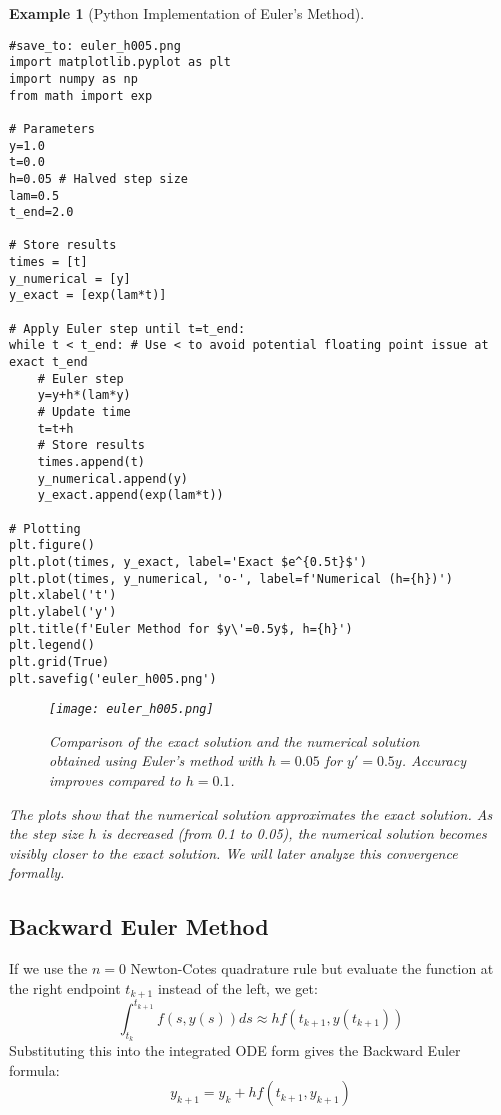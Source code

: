 \documentclass{article}
\newtheorem{example}{Example}
\begin{document}
\begin{example}[Python Implementation of Euler's Method]
\begin{verbatim}
#save_to: euler_h005.png
import matplotlib.pyplot as plt
import numpy as np
from math import exp

# Parameters
y=1.0
t=0.0
h=0.05 # Halved step size
lam=0.5
t_end=2.0

# Store results
times = [t]
y_numerical = [y]
y_exact = [exp(lam*t)]

# Apply Euler step until t=t_end:
while t < t_end: # Use < to avoid potential floating point issue at exact t_end
    # Euler step
    y=y+h*(lam*y)
    # Update time
    t=t+h
    # Store results
    times.append(t)
    y_numerical.append(y)
    y_exact.append(exp(lam*t))

# Plotting
plt.figure()
plt.plot(times, y_exact, label='Exact $e^{0.5t}$')
plt.plot(times, y_numerical, 'o-', label=f'Numerical (h={h})')
plt.xlabel('t')
plt.ylabel('y')
plt.title(f'Euler Method for $y\'=0.5y$, h={h}')
plt.legend()
plt.grid(True)
plt.savefig('euler_h005.png')
\end{verbatim}

\begin{figure}[h]
    \centering
    \texttt{[image: euler\_h005.png]}
    \caption{Comparison of the exact solution and the numerical solution obtained using Euler's method with $h=0.05$ for $y' = 0.5y$. Accuracy improves compared to $h=0.1$.}
    \label{fig:euler_h005}
\end{figure}

The plots show that the numerical solution approximates the exact solution. As the step size $h$ is decreased (from 0.1 to 0.05), the numerical solution becomes visibly closer to the exact solution. We will later analyze this convergence formally.
\end{example}

\subsection{Backward Euler Method}
If we use the $n=0$ Newton-Cotes quadrature rule but evaluate the function at the right endpoint $t_{k+1}$ instead of the left, we get:
\[
\int_{t_k}^{t_{k+1}} f(s, y(s)) ds \approx h f(t_{k+1}, y(t_{k+1}))
\]
Substituting this into the integrated ODE form gives the Backward Euler formula:
\begin{equation} \label{eq:backward_euler}
y_{k+1} = y_k + h f(t_{k+1}, y_{k+1})
\end{equation}
\end{document}
